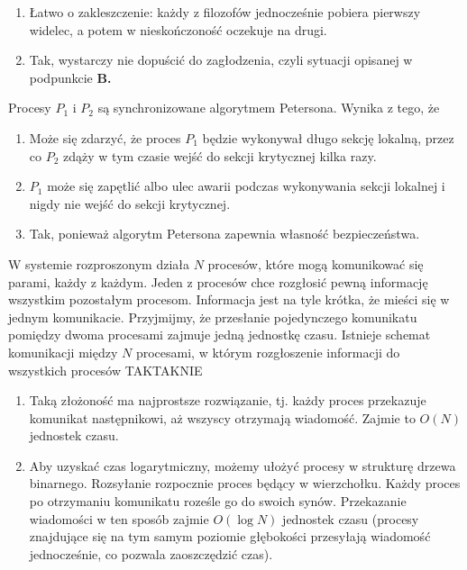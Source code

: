 \begin{solutions}
\begin{enumerate}[\bf A.]
        \item Łatwo o zakleszczenie: każdy z filozofów jednocześnie pobiera pierwszy widelec, a potem w nieskończoność oczekuje na drugi.

        \item Tak, wystarczy nie dopuścić do zagłodzenia, czyli sytuacji opisanej w podpunkcie \textbf{B.}
    \end{enumerate}

    \sol Procesy $P_1$ i $P_2$ są synchronizowane algorytmem Petersona. Wynika z tego, że

    \begin{enumerate}[\bf A.]
        \item Może się zdarzyć, że proces $P_1$ będzie wykonywał długo sekcję lokalną, przez co $P_2$ zdąży w tym czasie wejść do sekcji krytycznej kilka razy.

        \item $P_1$ może się zapętlić albo ulec awarii podczas wykonywania sekcji lokalnej i nigdy nie wejść do sekcji krytycznej.

        \item Tak, ponieważ algorytm Petersona zapewnia własność bezpieczeństwa.
    \end{enumerate}

    \sol W systemie rozproszonym działa $N$ procesów, które mogą komunikować się parami, każdy z każdym. Jeden z procesów chce rozgłosić pewną informację wszystkim pozostałym procesom. Informacja jest na tyle krótka, że mieści się w jednym komunikacie. Przyjmijmy, że przesłanie pojedynczego komunikatu pomiędzy dwoma procesami zajmuje jedną jednostkę czasu. Istnieje schemat komunikacji między $N$ procesami, w którym rozgłoszenie informacji do wszystkich procesów
    {TAK}{TAK}{NIE}

    \begin{enumerate}[\bf A.]
        \item Taką złożoność ma najprostsze rozwiązanie, tj. każdy proces przekazuje komunikat następnikowi, aż wszyscy otrzymają wiadomość. Zajmie to $O(N)$ jednostek czasu.

        \item Aby uzyskać czas logarytmiczny, możemy ułożyć procesy w strukturę drzewa binarnego. Rozsyłanie rozpocznie proces będący w wierzchołku. Każdy proces po otrzymaniu komunikatu roześle go do swoich synów. Przekazanie wiadomości w ten sposób zajmie $O(\log N)$ jednostek czasu (procesy znajdujące się na tym samym poziomie głębokości przesyłają wiadomość jednocześnie, co pozwala zaoszczędzić czas).


\end{enumerate}
\end{solutions}
